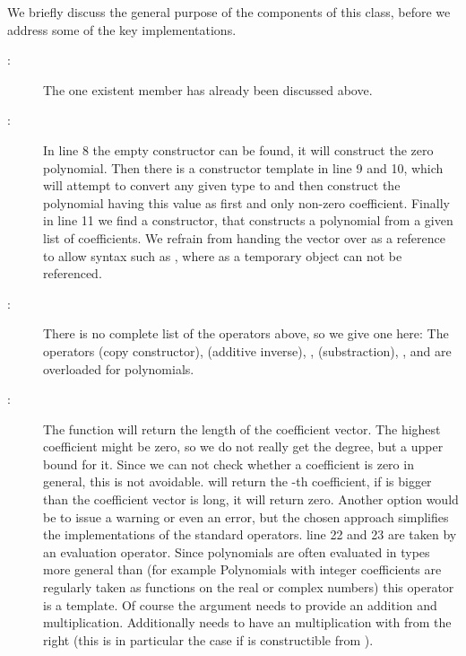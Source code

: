 We briefly discuss the general purpose of the components of this class, before we address some of the key implementations.
\begin{description}
\item[:] The one existent member has already been discussed above.
\item[:] In line 8 the empty constructor can be found, it will construct the zero polynomial. Then there is a constructor template in line 9 and 10, which will attempt to convert any given type  to  and then construct the polynomial having this value as first and only non-zero coefficient. Finally in line 11 we find a constructor, that constructs a polynomial from a given list of coefficients. We refrain from handing the vector over as a reference to allow syntax such as , where  as a temporary object can not be referenced.
\item[:] There is no complete list of the operators above, so we give one here: The operators \code{=} (copy constructor), \code{-} (additive inverse), \code{+}, \code{-} (substraction), \code{*}, \code{+=} and \code{*=} are overloaded for polynomials.
\item[:] The function  will return the length of the coefficient vector. The highest coefficient might be zero, so we do not really get the degree, but a upper bound for it. Since we can not check whether a coefficient is zero in general, this is not avoidable.  will return the -th coefficient, if  is bigger than the coefficient vector is long, it will return zero. Another option would be to issue a warning or even an error, but the chosen approach simplifies the implementations of the standard operators. line 22 and 23 are taken by an evaluation operator. Since polynomials are often evaluated in types more general than  (for example Polynomials with integer coefficients are regularly taken as functions on the real or complex numbers) this operator is a template. Of course the argument  needs to provide an addition and multiplication. Additionally  needs to have an multiplication with  from the right (this is in particular the case if  is constructible from ).
\end{description}

